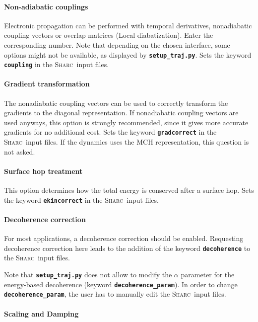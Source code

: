 \documentclass[a4paper,10pt,DIV=15,openany,twoside=false]{scrbook}
\newcommand{\sharc}{\textsc{Sharc}}
\newcommand{\ttt}[1]{\textbf{\texttt{#1}}}
\begin{document}
\paragraph{Non-adiabatic couplings}

Electronic propagation can be performed with temporal derivatives, nonadiabatic coupling vectors or overlap matrices (Local diabatization). Enter the corresponding number. Note that depending on the chosen interface, some options might not be available, as displayed by \ttt{setup\_traj.py}. Sets the keyword \ttt{coupling} in the \sharc\ input files.

\paragraph{Gradient transformation}

The nonadiabatic coupling vectors can be used to correctly transform the gradients to the diagonal representation. If nonadiabatic coupling vectors are used anyways, this option is strongly recommended, since it gives more accurate gradients for no additional cost. Sets the keyword \ttt{gradcorrect} in the \sharc\ input files. If the dynamics uses the MCH representation, this question is not asked. 

\paragraph{Surface hop treatment}

This option determines how the total energy is conserved after a surface hop. Sets the keyword \ttt{ekincorrect} in the \sharc\ input files.

\paragraph{Decoherence correction}

For most applications, a decoherence correction should be enabled. Requesting decoherence correction here leads to the addition of the keyword \ttt{decoherence} to the \sharc\ input files. 

Note that \ttt{setup\_traj.py} does not allow to modify the $\alpha$ parameter for the energy-based decoherence (keyword \ttt{decoherence\_param}). In order to change \ttt{decoherence\_param}, the user has to manually edit the \sharc\ input files.

\paragraph{Scaling and Damping}
\end{document}
